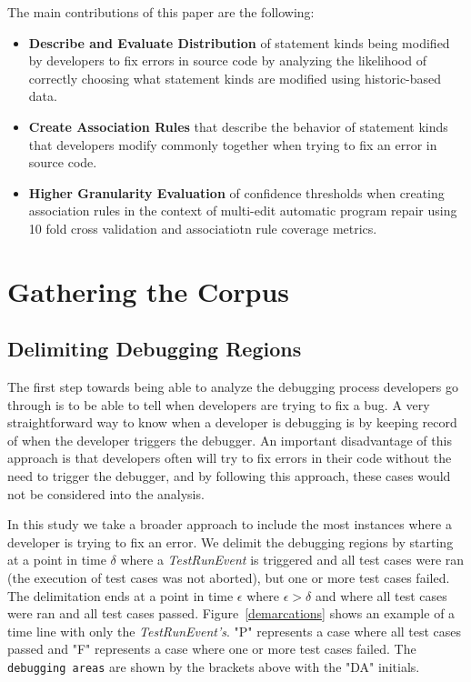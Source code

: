 \documentclass[sigconf]{acmart}
\begin{document}
The main contributions of this paper are the following:
\begin{itemize}
\item \textbf{Describe and Evaluate Distribution} of statement kinds being
modified by developers to fix errors in source code by
analyzing the likelihood of correctly choosing what statement
kinds are modified using historic-based data.

\item \textbf{Create Association Rules} that describe the behavior
of statement kinds that developers modify commonly together when
trying to fix an error in source code.  

\item \textbf{Higher Granularity Evaluation} 
of confidence thresholds when creating
association rules in the context of multi-edit automatic
program repair using 10 fold cross validation and associatiotn
rule coverage metrics. 

\end{itemize}

\section{Gathering the Corpus}
\subsection{Delimiting Debugging Regions}
\label{delimitDebugRegions}
The first step towards being able to analyze the debugging
process developers go through is to be able to tell when
developers are trying to fix a bug. A very straightforward 
way to know when a developer is debugging is by keeping
record of when the developer triggers the debugger. An important
disadvantage of this approach is that 
developers often will try to fix errors in their code without the
need to trigger the debugger, and by following this approach,
these cases would not
be considered into the analysis.

In this study we take a broader approach to include the most 
instances where a developer is trying to fix an error.
We delimit the debugging regions by starting at a point
in time $\delta$ where a \textit{TestRunEvent} is triggered and 
all test cases were ran (the execution of test cases
was not aborted), but one or more test cases failed.
The delimitation ends at a point in time $\epsilon $ where $ \epsilon > \delta$ 
and where all test cases were ran and all test cases passed.
Figure~\ref{demarcations} shows an example of a time line
with only the \textit{TestRunEvent's}. "P" represents a case
where all test cases passed and "F" represents a case where one
or more test cases failed. The \texttt{debugging areas} are shown by
the brackets above with the "DA" initials. 
\end{document}
